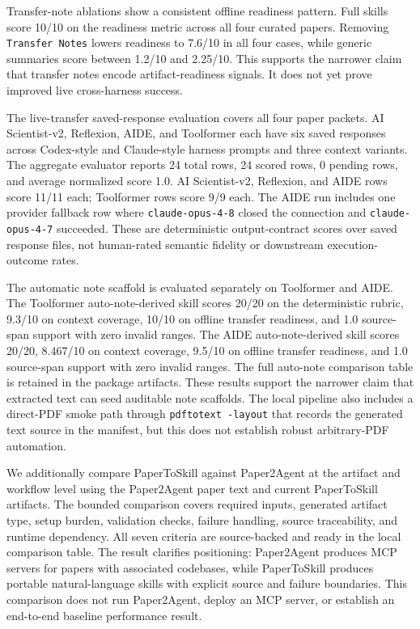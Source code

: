 Transfer-note ablations show a consistent offline readiness pattern. Full
skills score 10/10 on the readiness metric across all four curated papers.
Removing \texttt{Transfer Notes} lowers readiness to 7.6/10 in all four cases,
while generic summaries score between 1.2/10 and 2.25/10. This supports the
narrower claim that transfer notes encode artifact-readiness signals. It does
not yet prove improved live cross-harness success.

The live-transfer saved-response evaluation covers all four paper packets.
AI Scientist-v2, Reflexion, AIDE, and Toolformer each have six saved responses
across Codex-style and Claude-style harness prompts and three context variants.
The aggregate evaluator reports 24 total rows, 24 scored rows, 0 pending rows,
and average normalized score 1.0. AI Scientist-v2, Reflexion, and AIDE rows
score 11/11 each; Toolformer rows score 9/9 each. The AIDE run includes one
provider fallback row where \texttt{claude-opus-4-8} closed the connection and
\texttt{claude-opus-4-7} succeeded. These are deterministic output-contract
scores over saved response files, not human-rated semantic fidelity or
downstream execution-outcome rates.

The automatic note scaffold is evaluated separately on Toolformer and AIDE. The
Toolformer auto-note-derived skill scores 20/20 on the deterministic rubric,
9.3/10 on context coverage, 10/10 on offline transfer readiness, and 1.0
source-span support with zero invalid ranges. The AIDE auto-note-derived skill
scores 20/20, 8.467/10 on context coverage, 9.5/10 on offline transfer
readiness, and 1.0 source-span support with zero invalid ranges. The full
auto-note comparison table is retained in the package artifacts. These results
support the narrower claim that extracted text can seed auditable note
scaffolds. The local pipeline also
includes a direct-PDF smoke path through \texttt{pdftotext -layout} that records
the generated text source in the manifest, but this does not establish robust
arbitrary-PDF automation.

We additionally compare PaperToSkill against Paper2Agent at the artifact and
workflow level using the Paper2Agent paper text and current PaperToSkill
artifacts. The bounded comparison covers required inputs, generated artifact
type, setup burden, validation checks, failure handling, source traceability,
and runtime dependency. All seven criteria are source-backed and ready in the
local comparison table. The result clarifies positioning: Paper2Agent produces
MCP servers for papers with associated codebases, while PaperToSkill produces
portable natural-language skills with explicit source and failure boundaries.
This comparison does not run Paper2Agent, deploy an MCP server, or establish an
end-to-end baseline performance result.

